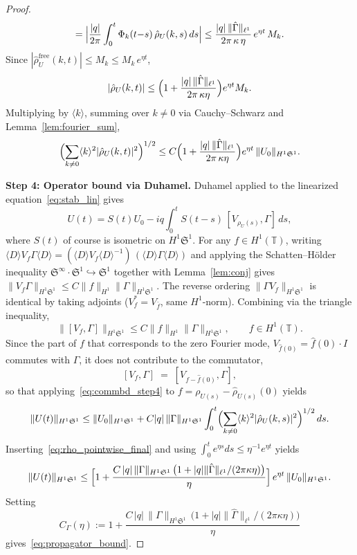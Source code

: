 \documentclass[11pt]{amsart}
\theoremstyle{definition}
\newcommand{\T}{\mathbb{T}}
\newcommand{\Sp}{\mathfrak{S}}
\begin{document}
\begin{proof}
\begin{equation}
  = \Bigl|\frac{|q|}{2\pi}
  \int_0^t\Phi_k(t{-}s)\,
  \hat\rho_U(k,s)\,ds\Bigr|
  \le \frac{|q|\,\|\hat\Gamma\|_{\ell^1}}
  {2\pi\,\kappa\,\eta}\,e^{\eta t}\,M_k.
\end{equation}
Since $|\hat\rho_U^{\mathrm{free}}(k,t)| \le M_k\le M_k\,e^{\eta t}$,
\[
  |\hat\rho_U(k,t)|
  \le \Bigl(1+\frac{|q|\,\|\hat\Gamma\|_{\ell^1}}
  {2\pi\,\kappa\eta}\Bigr)e^{\eta t}M_k.
\]
Multiplying by $\langle k\rangle$, summing over $k\ne 0$ via Cauchy--Schwarz and Lemma~\ref{lem:fourier_sum},
\begin{equation}\label{eq:rho_pointwise_final}
  \Bigl(\sum_{k\ne 0}\langle k\rangle^2
  |\hat\rho_U(k,t)|^2\Bigr)^{1/2}
  \le C\Bigl(1+\frac{|q|\,\|\hat\Gamma\|_{\ell^1}}
  {2\pi\,\kappa\eta}\Bigr)e^{\eta t}\,
  \|U_0\|_{H^1\Sp^1}.
\end{equation}

\medskip

\noindent\textbf{Step 4: Operator bound via Duhamel.} Duhamel applied to the linearized equation~\eqref{eq:stab_lin} gives
\[
  U(t) = S(t)U_0
  - iq\int_0^t S(t{-}s)\,
  [V_{\rho_U(s)},\Gamma]\,ds,
\]
where $S(t)$ of course is isometric on $H^1\Sp^1$. For any $f\in H^1(\T)$, writing $\langle D\rangle V_f\Gamma\langle D\rangle =(\langle D\rangle V_f\langle D\rangle^{-1}) \,(\langle D\rangle\Gamma\langle D\rangle)$ and applying the Schatten--H\"older inequality $\Sp^\infty\cdot\Sp^1\hookrightarrow\Sp^1$ together with Lemma~\ref{lem:conj} gives $\|V_f\Gamma\|_{H^1\Sp^1} \le C\|f\|_{H^1}\|\Gamma\|_{H^1\Sp^1}$. The reverse ordering $\|\Gamma V_f\|_{H^1\Sp^1}$ is identical by taking adjoints ($V_f^*=V_{\bar f}$, same $H^1$-norm). Combining via the triangle inequality,
\begin{equation}\label{eq:commbd_step4}
  \|[V_f,\Gamma]\|_{H^1\Sp^1}
  \le C\|f\|_{H^1}\|\Gamma\|_{H^1\Sp^1},
  \qquad f\in H^1(\T).
\end{equation}
Since the part of $f$ that corresponds to the zero Fourier mode, $V_{\hat f(0)}=\hat f(0)\cdot I$ commutes with $\Gamma$, it does not contribute to the commutator,
\begin{equation}\label{eq:comm_meanzero}
  [V_f,\Gamma] \;=\; [V_{f-\hat f(0)},\Gamma],
\end{equation}
so that applying~\eqref{eq:commbd_step4} to $f=\rho_{U(s)}-\hat\rho_{U(s)}(0)$  yields
\[
  \|U(t)\|_{H^1\Sp^1}
  \le \|U_0\|_{H^1\Sp^1}
  + C|q|\,\|\Gamma\|_{H^1\Sp^1}
  \int_0^t\Bigl(\sum_{k\ne 0}\langle k\rangle^2|\hat\rho_U(k,s)|^2\Bigr)^{1/2}\,ds.
\]
Inserting~\eqref{eq:rho_pointwise_final} and using $\int_0^t e^{\eta s}ds \le \eta^{-1}e^{\eta t}$ yields
\[
  \|U(t)\|_{H^1\Sp^1}
  \le \Bigl[1
  + \frac{C\,|q|\,
  \|\Gamma\|_{H^1\Sp^1}\,
  \bigl(1+|q|\|\hat\Gamma\|_{\ell^1}
  /(2\pi\kappa\eta)\bigr)}
  {\eta}\Bigr]\,e^{\eta t}\,
  \|U_0\|_{H^1\Sp^1}.
\]
Setting
\begin{equation}\label{eq:Cgamma_def}
  C_\Gamma(\eta)
  := 1
  + \frac{C\,|q|\,
  \|\Gamma\|_{H^1\Sp^1}\,
  \bigl(1+|q|\|\hat\Gamma\|_{\ell^1}
  /(2\pi\kappa\eta)\bigr)}
  {\eta}
\end{equation}
gives~\eqref{eq:propagator_bound}.
\end{proof}
\end{document}
